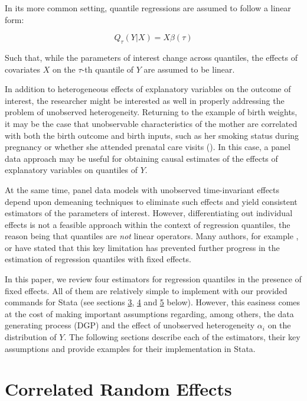 \documentclass[bib]{statapress}
\begin{document}
In its more common setting, quantile regressions are assumed to follow a
linear form:

\[\label{basic_qtile}
    Q_{\tau}(Y | X) =  X \beta(\tau)\]

Such that, while the parameters of interest change across quantiles, the
effects of covariates \(X\) on the \(\tau\)-th quantile of \(Y\) are
assumed to be linear.

In addition to heterogeneous effects of explanatory variables on the
outcome of interest, the researcher might be interested as well in
properly addressing the problem of unobserved heterogeneity. Returning
to the example of birth weights, it may be the case that unobservable
characteristics of the mother are correlated with both the birth outcome
and birth inputs, such as her smoking status during pregnancy or whether
she attended prenatal care visits (\citep{abrevaya2008}). In this case,
a panel data approach may be useful for obtaining causal estimates of
the effects of explanatory variables on quantiles of \(Y\).

At the same time, panel data models with unobserved time-invariant
effects depend upon demeaning techniques to eliminate such effects and
yield consistent estimators of the parameters of interest. However,
differentiating out individual effects is not a feasible approach within
the context of regression quantiles, the reason being that quantiles are
\emph{not} linear operators. Many authors, for example
\citep{abrevaya2008}, \citep{canay2011} or \citep{mss2019} have stated
that this key limitation has prevented further progress in the
estimation of regression quantiles with fixed effects.

In this paper, we review four estimators for regression quantiles in the
presence of fixed effects. All of them are relatively simple to
implement with our provided commands for Stata (see sections
\hyperref[sec:cre]{3}, \hyperref[sec:canay]{4} and
\hyperref[sec:mmqreg]{5} below). However, this easiness comes at the
cost of making important assumptions regarding, among others, the data
generating process (DGP) and the effect of unobserved heterogeneity
\(\alpha_i\) on the distribution of \(Y\). The following sections
describe each of the estimators, their key assumptions and provide
examples for their implementation in Stata.

\section{Correlated Random Effects}\label{sec:cre}
\end{document}

